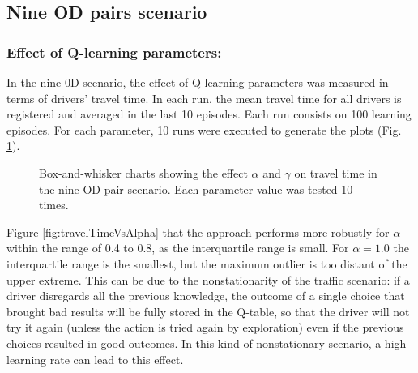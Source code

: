 \documentclass{RITA}
\begin{document}
\subsection{Nine OD pairs scenario}

\subsubsection{Effect of Q-learning parameters:}
In the nine 0D scenario, the effect of Q-learning parameters was measured in terms of drivers' travel time. In each run, the mean travel time for all drivers is registered and averaged in the last 10 episodes. Each run consists on 100 learning episodes. For each parameter, 10 runs were executed to generate the plots (Fig. \ref{fig:qLearningParams}).

\begin{figure}[ht]
  \centering
  \caption{Box-and-whisker charts showing the effect $\alpha$ and $\gamma$ on travel time in the nine OD pair scenario. Each parameter value was tested 10 times.}
  \label{fig:qLearningParams}
\end{figure}

Figure \ref{fig:travelTimeVsAlpha} that the approach performs more robustly for $\alpha$ within the range of 0.4 to 0.8, as the interquartile range is small. For $\alpha = 1.0$ the interquartile range is the smallest, but the maximum outlier is too distant of the upper extreme. This can be due to the nonstationarity of the traffic scenario: if a driver disregards all the previous knowledge, the outcome of a single choice that brought bad results will be fully stored in the Q-table, so that the driver will not try it again (unless the action is tried again by exploration) even if the previous choices resulted in good outcomes. In this kind of nonstationary scenario, a high learning rate can lead to this effect.
\end{document}
